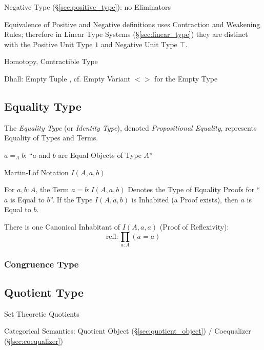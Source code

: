 Negative Type (\S\ref{sec:positive_type}): no Eliminators

Equivalence of Positive and Negative definitions uses Contraction and
Weakening Rules; therefore in Linear Type Systems
(\S\ref{sec:linear_type}) they are distinct with the Positive Unit
Type $1$ and Negative Unit Type $\top$.

Homotopy, Contractible Type %

Dhall: Empty Tuple ${}$, cf. Empty Variant $<>$ for the Empty Type



\subsection{Equality Type}\label{sec:equality_type}

The \emph{Equality Type} (or \emph{Identity Type}), denoted
\emph{Propositional Equality}, represents Equality of Types and Terms.

$a =_A b$: ``$a$ and $b$ are Equal Objects of Type $A$''

Martin-L\"of Notation $I(A,a,b)$

For $a,b:A$, the Term $a = b : I(A,a,b)$ Denotes the Type of Equality
Proofs for ``$a$ is Equal to $b$''. If the Type $I(A,a,b)$ is
Inhabited (a Proof exists), then $a$ is Equal to $b$.

There is one Canonical Inhabitant of $I(A,a,a)$ (Proof of
Reflexivity):
\[
  \text{refl}: \prod_{a:A} (a=a)
\]



\subsubsection{Congruence Type}\label{sec:congruence_type}




\subsection{Quotient Type}\label{sec:quotient_type}\hfill

Set Theoretic Quotients

Categorical Semantics: Quotient Object (\S\ref{sec:quotient_object}) /
Coequalizer (\S\ref{sec:coequalizer})



